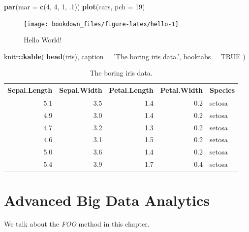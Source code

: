 \documentclass[]{krantz}
\makeatletter
\newenvironment{Shaded}{\begin{snugshade}}{\end{snugshade}}
\newcommand{\KeywordTok}[1]{\textcolor[rgb]{0.27,0.27,0.27}{\textbf{#1}}}
\newcommand{\DataTypeTok}[1]{\textcolor[rgb]{0.27,0.27,0.27}{#1}}
\newcommand{\DecValTok}[1]{\textcolor[rgb]{0.06,0.06,0.06}{#1}}
\newcommand{\StringTok}[1]{\textcolor[rgb]{0.5,0.5,0.5}{#1}}
\newcommand{\OtherTok}[1]{\textcolor[rgb]{0.56,0.35,0.01}{#1}}
\newcommand{\OperatorTok}[1]{\textcolor[rgb]{0.81,0.36,0.00}{\textbf{#1}}}
\newcommand{\NormalTok}[1]{#1}
\newenvironment{kframe}{%
\medskip{}
\setlength{\fboxsep}{.8em}
 \def\at@end@of@kframe{}%
 \ifinner\ifhmode%
  \def\at@end@of@kframe{\end{minipage}}%
  \begin{minipage}{\columnwidth}%
 \fi\fi%
 \def\FrameCommand##1{\hskip\@totalleftmargin \hskip-\fboxsep
 \colorbox{shadecolor}{##1}\hskip-\fboxsep
     \hskip-\linewidth \hskip-\@totalleftmargin \hskip\columnwidth}%
 \MakeFramed {\advance\hsize-\width
   \@totalleftmargin\z@ \linewidth\hsize
   \@setminipage}}%
 {\par\unskip\endMakeFramed%
 \at@end@of@kframe}
\renewenvironment{Shaded}{\begin{kframe}}{\end{kframe}}
\theoremstyle{definition}
\theoremstyle{definition}
\theoremstyle{definition}
\theoremstyle{remark}
\makeatother
\begin{document}
\begin{Shaded}
\begin{Highlighting}[]
\KeywordTok{par}\NormalTok{(}\DataTypeTok{mar =} \KeywordTok{c}\NormalTok{(}\DecValTok{4}\NormalTok{, }\DecValTok{4}\NormalTok{, }\DecValTok{1}\NormalTok{, .}\DecValTok{1}\NormalTok{))}
\KeywordTok{plot}\NormalTok{(cars, }\DataTypeTok{pch =} \DecValTok{19}\NormalTok{)}
\end{Highlighting}
\end{Shaded}

\begin{figure}
\texttt{[image: bookdown\_files/figure-latex/hello-1]} \caption{Hello World!}\label{fig:hello}
\end{figure}

\begin{Shaded}
\begin{Highlighting}[]
\NormalTok{knitr}\OperatorTok{::}\KeywordTok{kable}\NormalTok{(}
  \KeywordTok{head}\NormalTok{(iris), }\DataTypeTok{caption =} \StringTok{'The boring iris data.'}\NormalTok{,}
  \DataTypeTok{booktabs =} \OtherTok{TRUE}
\NormalTok{)}
\end{Highlighting}
\end{Shaded}

\begin{table}

\caption{\label{tab:iris}The boring iris data.}
\centering
\begin{tabular}[t]{rrrrl}
\toprule
Sepal.Length & Sepal.Width & Petal.Length & Petal.Width & Species\\
\midrule
5.1 & 3.5 & 1.4 & 0.2 & setosa\\
4.9 & 3.0 & 1.4 & 0.2 & setosa\\
4.7 & 3.2 & 1.3 & 0.2 & setosa\\
4.6 & 3.1 & 1.5 & 0.2 & setosa\\
5.0 & 3.6 & 1.4 & 0.2 & setosa\\
5.4 & 3.9 & 1.7 & 0.4 & setosa\\
\bottomrule
\end{tabular}
\end{table}

\chapter{Advanced Big Data Analytics}\label{advanced-big-data-analytics}

We talk about the \emph{FOO} method in this chapter.
\end{document}
